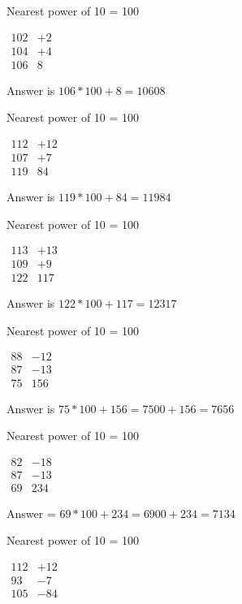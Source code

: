 Nearest power of 10 = 100

$
\begin{matrix}
    102 & + 2 \\
    104 & + 4 \\
    \hline
    106 & 8
\end{matrix}
$

Answer is $106 * 100 + 8 = 10608$

Nearest power of 10 = 100

$
\begin{matrix}
    112 & + 12 \\
    107 & + 7 \\
    \hline
    119 & 84
\end{matrix}
$

Answer is $119 * 100 + 84 = 11984$

Nearest power of 10 = 100

$
\begin{matrix}
    113 & +13 \\
    109 & +9 \\
    \hline
    122 & 117
\end{matrix}
$

Answer is $122 * 100 + 117 = 12317$

Nearest power of 10 = 100

$
\begin{matrix}
    88 & -12 \\
    87 & -13 \\
    \hline
    75 & 156
\end{matrix}
$

Answer is $75 * 100 + 156 = 7500 + 156 = 7656$

Nearest power of 10 = 100

$
\begin{matrix}
    82 & -18 \\
    87 & -13 \\
    \hline
    69 & 234
\end{matrix}
$

Answer = $69 * 100 + 234 = 6900 + 234 = 7134$

Nearest power of 10 = 100

$
\begin{matrix}
    112 & +12 \\
    93 & -7 \\
    \hline
    105 & -84
\end{matrix}
$

